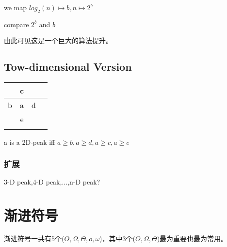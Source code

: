 \documentclass[11pt]{article}
\begin{document}
\begin{CJK}{UTF8}{gbsn}
\begin{itemize}
  we map $log_2(n)\mapsto b, n\mapsto 2^b$

  compare $2^b$ and $b$
\end{itemize}

由此可见这是一个巨大的算法提升。

\subsection{Tow-dimensional Version}

\begin{center}
  \begin{tabular}{|c|c|c|c|}
    \hline
     & c & &  \\\hline
    b & a & d & \\\hline
    & e & & \\\hline
    & & & \\
    \hline
  \end{tabular}
\end{center}

a is a 2D-peak iff $a \geq b, a \geq d, a \geq c, a \geq e$

\subsubsection{扩展}

3-D peak,4-D peak,...,n-D peak?

\section{渐进符号}

渐进符号一共有5个($O,\Omega,\Theta, o, \omega$)，其中3个($O,\Omega,\Theta$)最为重要也最为常用。







\end{CJK}
\end{document}
